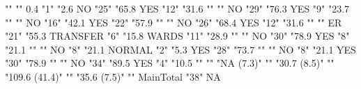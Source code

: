 \documentclass{article}\usepackage[]{graphicx}\usepackage[]{color}
\begin{document}
                                    ""             ""     
0.4                                 "1"            "2.6%
NO                                  "25"           "65.8%
YES                                 "12"           "31.6%
                                    ""             ""     
NO                                  "29"           "76.3%
YES                                 "9"            "23.7%
                                    ""             ""     
NO                                  "16"           "42.1%
YES                                 "22"           "57.9%
                                    ""             ""     
NO                                  "26"           "68.4%
YES                                 "12"           "31.6%
                                    ""             ""     
ER                                  "21"           "55.3%
TRANSFER                            "6"            "15.8%
WARDS                               "11"           "28.9%
                                    ""             ""     
NO                                  "30"           "78.9%
YES                                 "8"            "21.1%
                                    ""             ""     
NO                                  "8"            "21.1%
NORMAL                              "2"            "5.3%
YES                                 "28"           "73.7%
                                    ""             ""     
NO                                  "8"            "21.1%
YES                                 "30"           "78.9%
                                    ""             ""     
NO                                  "34"           "89.5%
YES                                 "4"            "10.5%
                                    ""             ""     
                                    "NA (7.3)"     ""     
                                    "30.7 (8.5)"   ""     
                                    "109.6 (41.4)" ""     
                                    "35.6 (7.5)"   ""     
MainTotal                           "38"           NA     
\end{document}
